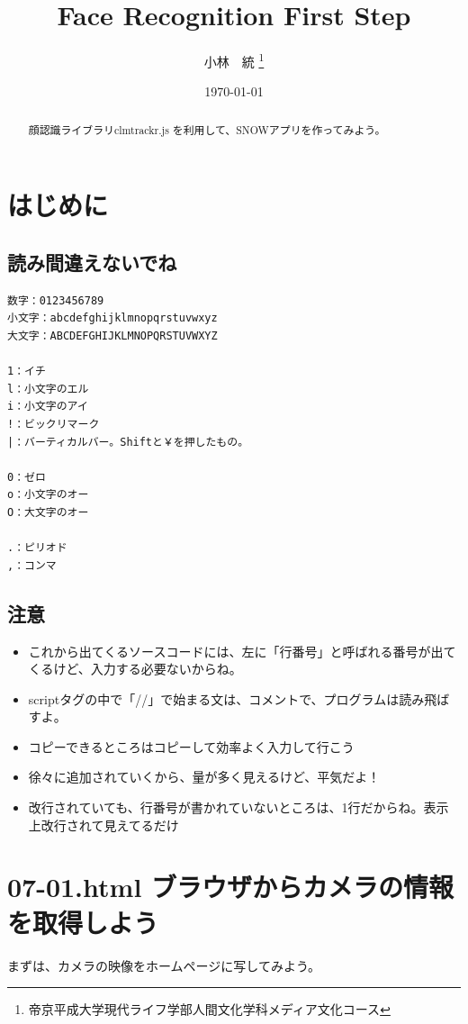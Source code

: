 \documentclass[mingoth,11pt,a4j,uplatex]{jsarticle}
\title{Face Recognition First Step}
\author{小林　統 \thanks{帝京平成大学現代ライフ学部人間文化学科メディア文化コース}}
\date{\today}
\begin{document}

\maketitle

\begin{abstract}
顔認識ライブラリclmtrackr.js を利用して、SNOWアプリを作ってみよう。
\end{abstract}

\tableofcontents
\newpage

\section{はじめに}
\subsection{読み間違えないでね}

\begin{lstlisting}[caption=読み間違えないでね]
数字：0123456789
小文字：abcdefghijklmnopqrstuvwxyz
大文字：ABCDEFGHIJKLMNOPQRSTUVWXYZ

1：イチ
l：小文字のエル
i：小文字のアイ
!：ビックリマーク
|：バーティカルバー。Shiftと￥を押したもの。

0：ゼロ
o：小文字のオー
O：大文字のオー

.：ピリオド
,：コンマ
\end{lstlisting}

\subsection{注意}
\begin{itemize}
\item これから出てくるソースコードには、左に「行番号」と呼ばれる番号が出てくるけど、入力する必要ないからね。

\item scriptタグの中で「//」で始まる文は、コメントで、プログラムは読み飛ばすよ。

\item コピーできるところはコピーして効率よく入力して行こう
\item 徐々に追加されていくから、量が多く見えるけど、平気だよ！
\item 改行されていても、行番号が書かれていないところは、1行だからね。表示上改行されて見えてるだけ
\end{itemize}

\newpage
\section{07-01.html ブラウザからカメラの情報を取得しよう}
\small
まずは、カメラの映像をホームページに写してみよう。
\end{document}
